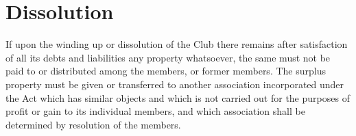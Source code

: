 \documentclass[11pt]{article} %
\begin{document}
\section{Dissolution}
If upon the winding up or dissolution of the Club there remains after satisfaction of all its debts and liabilities any property whatsoever, the same must not be paid to or distributed among the members, or former members. The surplus property must be given or transferred to another association incorporated under the Act which has similar objects and which is not carried out for the purposes of profit or gain to its individual members, and which association shall be determined by resolution of the members.
\end{document}

